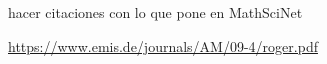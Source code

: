 \documentclass[TFM.tex]{subfiles}
\begin{document}
%


\begin{thebibliography}{}






 hacer citaciones con lo que pone en MathSciNet

 \url{https://www.emis.de/journals/AM/09-4/roger.pdf}












\end{thebibliography}
\end{document}
